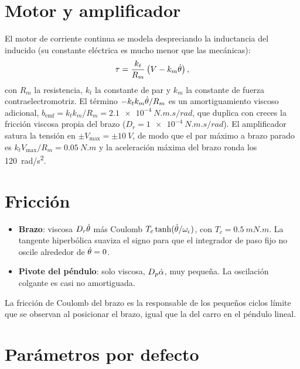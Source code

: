 \section{Motor y amplificador}

El motor de corriente continua se modela despreciando la inductancia del inducido (su constante eléctrica es mucho menor que las mecánicas):
\begin{equation}
  \tau = \frac{k_t}{R_m}\left(V - k_m\dot{\theta}\right),
  \label{eq:motor}
\end{equation}
con $R_m$ la resistencia, $k_t$ la constante de par y $k_m$ la constante de fuerza contraelectromotriz. El término $-k_tk_m\dot{\theta}/R_m$ es un amortiguamiento viscoso adicional, $b_{\text{emf}}=k_tk_m/R_m=\SI{2.1e-4}{N.m.s/rad}$, que duplica con creces la fricción viscosa propia del brazo ($D_r=\SI{1e-4}{N.m.s/rad}$). El amplificador satura la tensión en $\pm V_{\max}=\pm\SI{10}{V}$, de modo que el par máximo a brazo parado es $k_tV_{\max}/R_m=\SI{0.05}{N.m}$ y la aceleración máxima del brazo ronda los \SI{120}{rad/s^2}.

\section{Fricción}

\begin{itemize}
  \item \textbf{Brazo}: viscosa $D_r\dot{\theta}$ más Coulomb $T_c\tanh(\dot{\theta}/\omega_\epsilon)$, con $T_c=\SI{0.5}{mN.m}$. La tangente hiperbólica suaviza el signo para que el integrador de paso fijo no oscile alrededor de $\dot{\theta}=0$.
  \item \textbf{Pivote del péndulo}: solo viscosa, $D_p\dot{\alpha}$, muy pequeña. La oscilación colgante es casi no amortiguada.
\end{itemize}
La fricción de Coulomb del brazo es la responsable de los pequeños ciclos límite que se observan al posicionar el brazo, igual que la del carro en el péndulo lineal.

\section{Parámetros por defecto}

